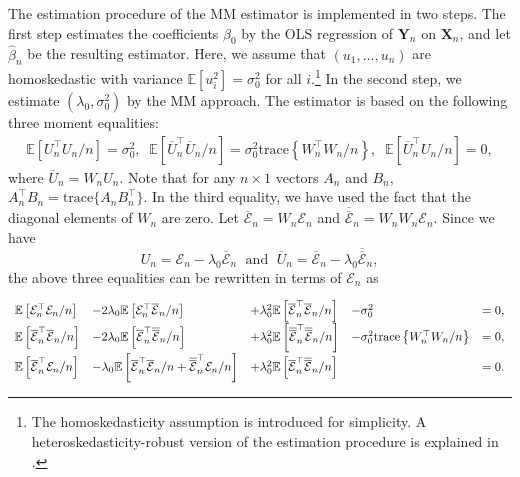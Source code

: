 \documentclass[10.5pt, A4paper, openany, uplatex]{book}
\newcommand{\mbf}{\mathbf}
\newcommand{\mcl}{\mathcal}
\newcommand{\mrm}{\mathrm}
\newcommand{\E}{\mathbb{E}}
\renewcommand{\hat}{\widehat}
\renewcommand{\bar}{\overline}
\numberwithin{equation}{section}
\begin{document}
The estimation procedure of the MM estimator is implemented in two steps.
The first step estimates the coefficients $\beta_0$ by the OLS regression of $\mbf{Y}_n$ on $\mbf{X}_n$, and let $\hat \beta_n$ be the resulting estimator.
Here, we assume that $(u_1, \ldots , u_n)$ are homoskedastic with variance $\E[u_i^2] = \sigma_0^2$ for all $i$.\footnote{
	The homoskedasticity assumption is introduced for simplicity.
	A heteroskedasticity-robust version of the estimation procedure is explained in \cite{kelejian2010specification}.
}
In the second step, we estimate $(\lambda_0, \sigma_0^2)$ by the MM approach.
The estimator is based on the following three moment equalities: 
\begin{align*}
	\E\left[ U_n^\top U_n /n \right] = \sigma_0^2, \;\; \E\left[ \bar U_n^\top \bar U_n /n \right] =  \sigma_0^2  \mrm{trace}\left\{ W_n^\top W_n/n \right\}, \;\;  \E\left[ \bar U_n^\top U_n/n \right] = 0,
\end{align*}
where $\bar U_n = W_n U_n$.
Note that for any $n \times 1$ vectors $A_n$ and $B_n$, $A_n^\top B_n = \mrm{trace}\{ A_n B_n^\top \}$.
In the third equality, we have used the fact that the diagonal elements of $W_n$ are zero.
Let $\bar{\mcl{E}}_n = W_n \mcl{E}_n$ and $\bar{\bar{\mcl{E}}}_n = W_n W_n \mcl{E}_n$.
Since we have
\[
	U_n = \mcl{E}_n - \lambda_0 \bar{\mcl{E}}_n\; \text{ and }\; \bar U_n = \bar{\mcl{E}}_n - \lambda_0 \bar{\bar{\mcl{E}}}_n,
\]
 the above three equalities can be rewritten in terms of $\mcl{E}_n$ as
\begin{align*}\renewcommand{\arraystretch}{1.8}
\begin{array}{lllll}
	\E\left[ \mcl{E}_n^\top \mcl{E}_n /n\right] 
	& - 2\lambda_0 \E\left[ \mcl{E}_n^\top \bar{\mcl{E}}_n/n \right] 
	& +  \lambda^2_0 \E\left[ \bar{\mcl{E}}_n^\top \bar{\mcl{E}}_n/n \right] 
	& - \sigma^2_0 
	& = 0,\\
	\E\left[ \bar{\mcl{E}}_n^\top \bar{\mcl{E}}_n/n \right] 
	& - 2\lambda_0 \E\left[ \bar{\mcl{E}}_n^\top \bar{\bar{\mcl{E}}}_n/n \right] 
	& +  \lambda^2_0 \E\left[ \bar{\bar{\mcl{E}}}_n^\top \bar{\bar{\mcl{E}}}_n/n \right] 
	& - \sigma^2_0 \mrm{trace}\left\{ W_n^\top W_n/n \right\} 
	& = 0, \\
	\E\left[ \bar{\mcl{E}}_n^\top \mcl{E}_n/n \right] 
	& - \lambda_0 \E\left[ \bar{\mcl{E}}_n^\top \bar{\mcl{E}}_n/n + \bar{\bar{\mcl{E}}}_n^\top \mcl{E}_n/n\right] 
	& +  \lambda^2_0 \E\left[ \bar{\mcl{E}}_n^\top \bar{\bar{\mcl{E}}}_n/n \right]  
	&
	& = 0.
\end{array}
\end{align*}
\end{document}
